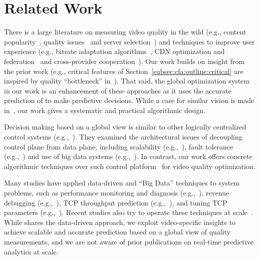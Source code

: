 \section{Related Work}
\label{sec:cfa:related}


There is a large literature on measuring video quality in the wild 
(e.g., content popularity~\cite{plissonneau2012longitudinal,beijing-imc09}, 
quality issues~\cite{jiang2013shedding} and server 
selection~\cite{youtubecdn,su2006drafting}) and techniques to 
improve user experience (e.g., bitrate adaptation 
algorithms~\cite{yin2015control,festive,huang2014buffer}, CDN 
optimization and federation~\cite{sigcomm12cdnmulti,
peterson2013framework,balachandran2013analyzing,
mukerjee2015practical} and cross-provider 
cooperation~\cite{yu2012tradeoffs,frank2013pushing,eona}). 
Our work builds on insight from the prior work (e.g., critical features 
of Section~\ref{subsec:cfa:outline:critical} are inspired by quality ``bottleneck'' 
in~\cite{jiang2013shedding}). 
That said, the global optimization system in our work is an 
enhancement of these approaches as it  uses the accurate prediction 
of \dda to make predictive decisions. 
While a case for similar vision is made in~\cite{sigcomm12}, our work 
gives a systematic and practical algorithmic design.

Decision making based on a global view is similar to other logically 
centralized control systems (e.g.,~\cite{rcp,sigcomm12,c3,
suresh2015c3}). They examined the architectural issues of 
decoupling control plane from data plane, including scalability 
(e.g.,~\cite{tootoonchian2012controller,dixit2013towards}), fault 
tolerance (e.g.,~\cite{panda2013cap,yan2007tesseract}) and use of 
big data systems (e.g.,~\cite{c3,spark}). 
In contrast, our work offers concrete algorithmic techniques over 
such control platform~\cite{c3} for video quality optimization. 

Many studies have applied data-driven and ``Big Data'' techniques 
to system problems, such as performance monitoring and diagnosis 
(e.g.,~\cite{stemm2000network,choffnes2010crowdsourcing,
sambasivan2011diagnosing}), revenue debugging 
(e.g.,~\cite{bhagwan2014adtributor}), TCP throughput prediction 
(e.g.,~\cite{he2005predictability,mirza2007machine}), and tuning 
TCP parameters (e.g.,~\cite{spand,savage1999case}). 
Recent studies also try to operate these techniques at 
scale~\cite{velox-cidr}.
While \dda shares the data-driven approach, we exploit video-specific 
insights to achieve scalable and accurate prediction based on a global 
view of quality measurements, and we are not aware of prior 
publications on real-time predictive analytics at scale.

